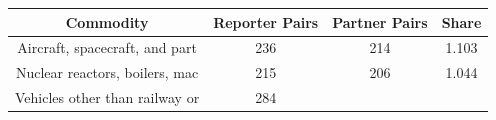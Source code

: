 \documentclass[10pt,]{article}
\begin{document}
\begin{longtable}[]{@{}cccc@{}}
\toprule
\begin{minipage}[b]{0.38\columnwidth}\centering\strut
Commodity\strut
\end{minipage} & \begin{minipage}[b]{0.21\columnwidth}\centering\strut
Reporter Pairs\strut
\end{minipage} & \begin{minipage}[b]{0.20\columnwidth}\centering\strut
Partner Pairs\strut
\end{minipage} & \begin{minipage}[b]{0.09\columnwidth}\centering\strut
Share\strut
\end{minipage}\tabularnewline
\midrule
\endhead
\begin{minipage}[t]{0.38\columnwidth}\centering\strut
Aircraft, spacecraft, and part\strut
\end{minipage} & \begin{minipage}[t]{0.21\columnwidth}\centering\strut
236\strut
\end{minipage} & \begin{minipage}[t]{0.20\columnwidth}\centering\strut
214\strut
\end{minipage} & \begin{minipage}[t]{0.09\columnwidth}\centering\strut
1.103\strut
\end{minipage}\tabularnewline
\begin{minipage}[t]{0.38\columnwidth}\centering\strut
Nuclear reactors, boilers, mac\strut
\end{minipage} & \begin{minipage}[t]{0.21\columnwidth}\centering\strut
215\strut
\end{minipage} & \begin{minipage}[t]{0.20\columnwidth}\centering\strut
206\strut
\end{minipage} & \begin{minipage}[t]{0.09\columnwidth}\centering\strut
1.044\strut
\end{minipage}\tabularnewline
\begin{minipage}[t]{0.38\columnwidth}\centering\strut
Vehicles other than railway or\strut
\end{minipage} & \begin{minipage}[t]{0.21\columnwidth}\centering\strut
284\strut
\end{minipage} & \begin{minipage}[t]{0.20\columnwidth}\centering\strut

\end{minipage}
\end{longtable}
\end{document}
